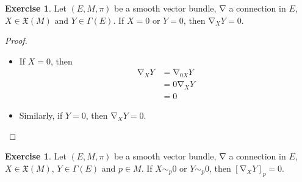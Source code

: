 \documentclass{book}
\theoremstyle{definition}
\newtheorem{ex}[definition]{Exercise}
\newcommand{\Gam}{\Gamma}
\newcommand{\MFX}{\mathfrak{X}}
\DeclareMathOperator{\nab}{\nabla}
\DeclareMathOperator*{\0}{\mbf{0}}
\DeclareMathOperator*{\1}{\mbf{1}}
\begin{document}
	\begin{ex}
		Let $(E, M, \pi)$ be a smooth vector bundle, $\nab$ a connection in $E$, $X \in \MFX(M)$ and $Y \in \Gam(E)$. If $X = 0$ or $Y = 0$, then $\nab_X Y = 0$.
	\end{ex}

	\begin{proof}\
		\begin{itemize}
			\item If $X = 0$, then 
			\begin{align*}
				\nab_X Y
				& = \nab_{0 X} Y \\
				& = 0 \nab_X Y \\
				& = 0
			\end{align*}
			\item Similarly, if $Y = 0$, then $\nab_X Y = 0$.
		\end{itemize}
	\end{proof}

	\begin{ex}
		Let $(E, M, \pi)$ be a smooth vector bundle, $\nab$ a connection in $E$, $X \in \MFX(M)$, $Y \in \Gam(E)$ and $p \in M$. If $X \sim_p 0$ or $Y \sim_p 0$, then $[\nab_{X}Y]_p = 0$.
	\end{ex}
\end{document}
